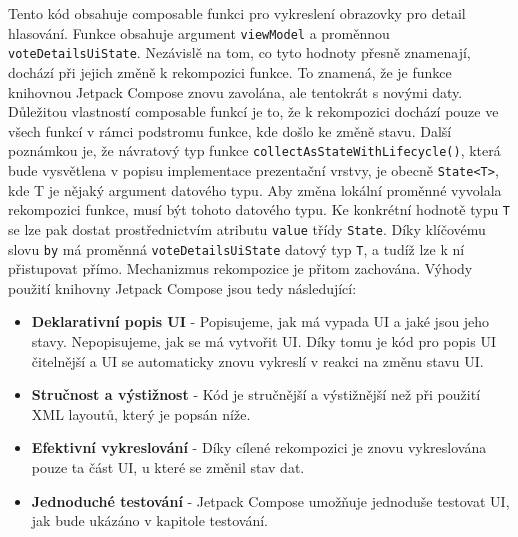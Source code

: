 \noindent Tento kód obsahuje composable funkci pro vykreslení obrazovky pro detail hlasování. Funkce obsahuje argument \lstinline|viewModel| a proměnnou \lstinline|voteDetailsUiState|. Nezávislě na tom, co tyto hodnoty přesně znamenají, dochází při jejich změně k rekompozici funkce. To znamená, že je funkce knihovnou Jetpack Compose znovu zavolána, ale tentokrát s novými daty. Důležitou vlastností composable funkcí je to, že k rekompozici dochází pouze ve všech funkcí v rámci podstromu \linebreak funkce, kde došlo ke změně stavu. Další poznámkou je, že návratový typ funkce \linebreak \lstinline|collectAsStateWithLifecycle()|, která bude vysvětlena v popisu implementace prezentační \linebreak vrstvy, je obecně \lstinline|State<T>|, kde T je nějaký argument datového typu. Aby změna lokální proměnné vyvolala rekompozici funkce, musí být tohoto datového typu. Ke konkrétní hodnotě typu \lstinline|T| se lze pak dostat prostřednictvím atributu \lstinline|value| třídy \lstinline|State|. Díky klíčovému slovu \lstinline|by| má proměnná \lstinline|voteDetailsUiState| datový typ \lstinline|T|, a tudíž lze k ní přistupovat přímo. Mechanizmus rekompozice je přitom zachována. Výhody použití knihovny Jetpack Compose jsou tedy následující:

\begin{itemize}
	\item \textbf{Deklarativní popis UI} - Popisujeme, jak má vypada UI a jaké jsou jeho stavy. Nepopisujeme, jak se má vytvořit UI. Díky tomu je kód pro popis UI čitelnější a UI se automaticky znovu vykreslí v reakci na změnu stavu UI.
	
	\item \textbf{Stručnost a výstižnost} - Kód je stručnější a výstižnější než při použití XML layoutů, který je popsán níže.
	
	\item \textbf{Efektivní vykreslování} - Díky cílené rekompozici je znovu vykreslována pouze ta část \linebreak UI, u které se změnil stav dat.
	
	\item \textbf{Jednoduché testování} - Jetpack Compose umožňuje jednoduše testovat UI, jak bude ukázáno v kapitole testování.
\end{itemize}

